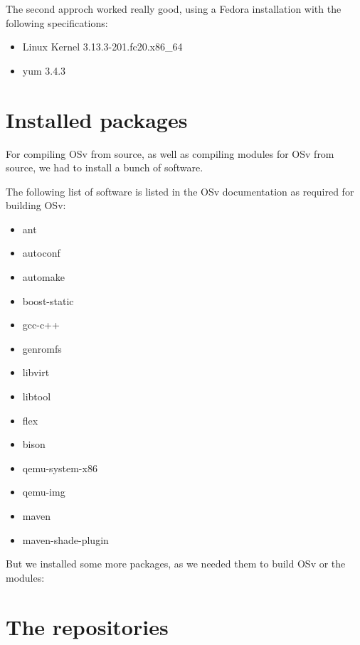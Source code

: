     The second approch worked really good, using a Fedora installation with the
    following specifications:

        \begin{itemize}
            \item Linux Kernel 3.13.3-201.fc20.x86\_64
            \item yum 3.4.3
        \end{itemize}


    \section{Installed packages}

        For compiling OSv from source, as well as compiling modules for OSv from
        source, we had to install a bunch of software.

        The following list of software is listed in the OSv documentation as
        required for building OSv:

            \begin{itemize}
                \item ant
                \item autoconf
                \item automake
                \item boost-static
                \item gcc-c++
                \item genromfs
                \item libvirt
                \item libtool
                \item flex
                \item bison
                \item qemu-system-x86
                \item qemu-img
                \item maven
                \item maven-shade-plugin
            \end{itemize}

        But we installed some more packages, as we needed them to build OSv or
        the modules:


    \section{The repositories}

